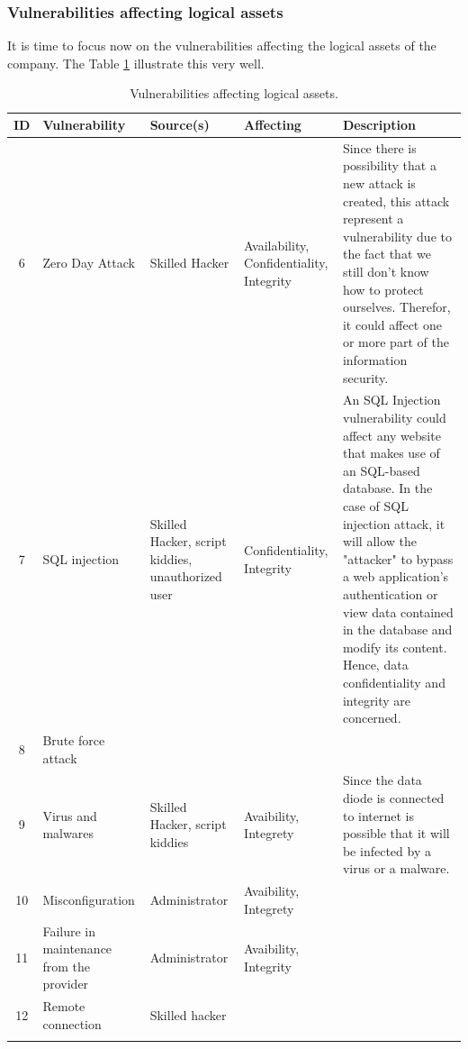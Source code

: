 \documentclass[a4paper,10pt]{article}
\begin{document}
\subsubsection{Vulnerabilities affecting logical assets}
It is time to focus now on the vulnerabilities affecting the logical assets of the company. The Table \ref{tab:logic-assets} illustrate this very well.

\begin{longtable}{|c|p{2.5cm}|p{2.5cm}|p{2.5cm}|p{6.5cm}|}
\hline
\textbf{ID}&  \textbf{Vulnerability} & \textbf{Source(s)} & \textbf{Affecting} & \textbf{Description} \\
\hline
6 & Zero Day Attack & Skilled Hacker & Availability, Confidentiality, Integrity & Since there is possibility that a new attack is created, this attack represent a vulnerability due to the fact that we still don't know how to protect ourselves. Therefor, it could affect one or more part of the information security. \\
\hline
7 &  SQL injection  & Skilled Hacker, script kiddies, unauthorized user & Confidentiality, Integrity & An SQL Injection vulnerability could affect any website that makes use of an SQL-based database.
In the case of SQL injection attack, it will allow the "attacker" to bypass a web application's authentication or view data contained in the database and modify its content. Hence, data confidentiality and integrity are concerned.\\
\hline
8 & Brute force attack &  &  & \\
\hline
9 & Virus and malwares & Skilled Hacker, script kiddies  & Avaibility, Integrety & Since the data diode is connected to internet is possible that it will be infected by a virus or a malware. \\
\hline
10 & Misconfiguration & Administrator & Avaibility, Integrety & \\
\hline
11 &  Failure in maintenance from the provider & Administrator  & Avaibility, Integrity  & \\
\hline
12 &  Remote connection & Skilled hacker &  & \\
\hline
\caption{Vulnerabilities affecting logical assets.}
\label{tab:logic-assets}
\end{longtable}
\end{document}
